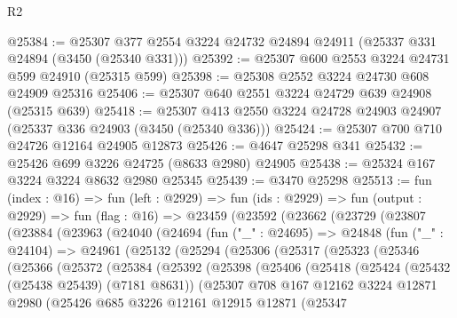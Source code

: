 \begin{lexlean}{R2}
\begin{coremodule}
@25384 := @25307 @377 @2554 @3224 @24732 @24894 @24911 (@25337 @331 @24894 (@3450 (@25340 @331)))
@25392 := @25307 @600 @2553 @3224 @24731 @599 @24910 (@25315 @599)
@25398 := @25308 @2552 @3224 @24730 @608 @24909 @25316
@25406 := @25307 @640 @2551 @3224 @24729 @639 @24908 (@25315 @639)
@25418 := @25307 @413 @2550 @3224 @24728 @24903 @24907 (@25337 @336 @24903 (@3450 (@25340 @336)))
@25424 := @25307 @700 @710 @24726 @12164 @24905 @12873
@25426 := @4647 @25298 @341
@25432 := @25426 @699 @3226 @24725 (@8633 @2980) @24905
@25438 := @25324 @167 @3224 @3224 @8632 @2980 @25345
@25439 := @3470 @25298
@25513 := fun (index : @16) =>
  fun (left : @2929) =>
  fun (ids : @2929) =>
  fun (output : @2929) =>
  fun (flag : @16) =>
  @23459
    (@23592
      (@23662
        (@23729
          (@23807
            (@23884
              (@23963
                (@24040
                  (@24694
                    (fun ("_" : @24695) =>
                    @24848
                      (fun ("_" : @24104) =>
                      @24961
                        (@25132
                          (@25294
                            (@25306
                              (@25317
                                (@25323
                                  (@25346
                                    (@25366
                                      (@25372
                                        (@25384
                                          (@25392
                                            (@25398
                                              (@25406
                                                (@25418
                                                  (@25424
                                                    (@25432 (@25438 @25439) (@7181 @8631))
                                                    (@25307
                                                      @708
                                                      @167
                                                      @12162
                                                      @3224
                                                      @12871
                                                      @2980
                                                      (@25426
                                                        @685
                                                        @3226
                                                        @12161
                                                        @12915
                                                        @12871
                                                        (@25347

\end{coremodule}
\end{lexlean}
